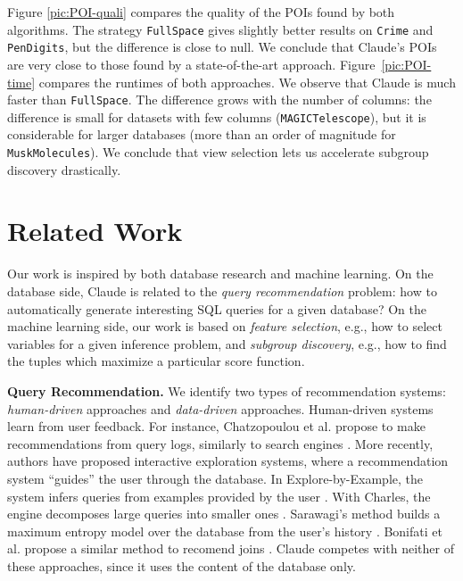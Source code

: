 Figure \ref{pic:POI-quali} compares the quality of the POIs found by both
algorithms. The strategy \texttt{FullSpace} gives slightly better results on
\texttt{Crime} and \texttt{PenDigits}, but the difference is close to null. We
conclude that Claude's POIs are very close to those found by a state-of-the-art
approach. Figure~\ref{pic:POI-time} compares the runtimes of both approaches.
We observe that Claude is much faster than \texttt{FullSpace}. The difference
grows with the number of columns: the difference is small for datasets with
few columns (\texttt{MAGICTelescope}), but it is considerable for larger
databases (more than an order of magnitude for \texttt{MuskMolecules}). We
conclude that view selection lets us accelerate subgroup discovery drastically.

\section{Related Work}
Our work is inspired by both database research and machine learning. On the
database side, Claude is related to the \emph{query recommendation} problem:
how to automatically generate interesting SQL queries for a given database? On
the machine learning side, our work is based on \emph{feature selection}, e.g.,
how to select variables for a given inference problem, and \emph{subgroup
discovery}, e.g., how to find the tuples which maximize a particular score
function.

\textbf{Query Recommendation.} We identify two types of recommendation systems:
\emph{human-driven} approaches and \emph{data-driven} approaches. Human-driven
systems learn from user feedback. For instance, Chatzopoulou et al. propose to
make recommendations from query logs, similarly to search engines
\cite{chatzopoulou2009query}. More recently, authors have proposed interactive
exploration systems, where a recommendation system ``guides'' the user through
the database. In Explore-by-Example, the system infers queries from examples
provided by the user \cite{dimitriadou2014explore}. With Charles, the engine
decomposes large queries into smaller ones \cite{sellam2013meet}. Sarawagi's
method builds a maximum entropy model over the database from the user's history 
\cite{sarawagi2000user}. Bonifati et al. propose a similar method to recomend
joins \cite{bonifati2014interactive}.  Claude competes with neither of these
approaches, since it uses the content of the database only.

